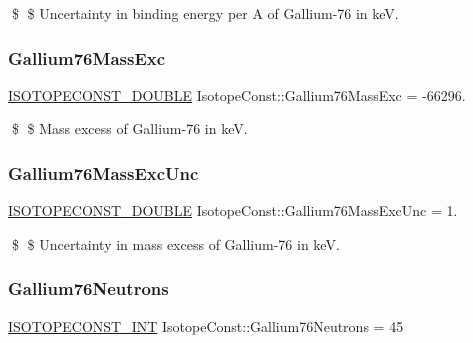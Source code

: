 \$ \$ Uncertainty in binding energy per A of Gallium-\/76 in keV. \mbox{\label{group___isotope_const-_gallium-_ga76_ga8a4313f2e8303aafc883c328ec62bdcd}} 
\subsubsection{\texorpdfstring{Gallium76\+Mass\+Exc}{Gallium76MassExc}}
{\footnotesize\ttfamily \mbox{\hyperlink{group___isotope_const-_macros_ga8f45a7272ce02c0b4c65c44636ed719a}{I\+S\+O\+T\+O\+P\+E\+C\+O\+N\+S\+T\+\_\+\+D\+O\+U\+B\+LE}} Isotope\+Const\+::\+Gallium76\+Mass\+Exc = -\/66296.}

\$ \$ Mass excess of Gallium-\/76 in keV. \mbox{\label{group___isotope_const-_gallium-_ga76_ga1da4fd3474538ab339837c398d5eecf0}} 
\subsubsection{\texorpdfstring{Gallium76\+Mass\+Exc\+Unc}{Gallium76MassExcUnc}}
{\footnotesize\ttfamily \mbox{\hyperlink{group___isotope_const-_macros_ga8f45a7272ce02c0b4c65c44636ed719a}{I\+S\+O\+T\+O\+P\+E\+C\+O\+N\+S\+T\+\_\+\+D\+O\+U\+B\+LE}} Isotope\+Const\+::\+Gallium76\+Mass\+Exc\+Unc = 1.}

\$ \$ Uncertainty in mass excess of Gallium-\/76 in keV. \mbox{\label{group___isotope_const-_gallium-_ga76_gac4bc6029ea77c8bc19d7c8a6910f4c38}} 
\subsubsection{\texorpdfstring{Gallium76\+Neutrons}{Gallium76Neutrons}}
{\footnotesize\ttfamily \mbox{\hyperlink{group___isotope_const-_macros_ga5f18360b3e99483a35c32d789e62621c}{I\+S\+O\+T\+O\+P\+E\+C\+O\+N\+S\+T\+\_\+\+I\+NT}} Isotope\+Const\+::\+Gallium76\+Neutrons = 45}

